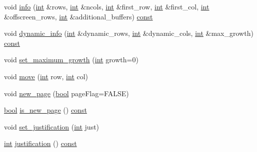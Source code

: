 \begin{DoxyCompactItemize}
\item 
void \hyperlink{class_n_curses_form_field_a7f7ee023466c743f620fc8812166243a}{info} (\hyperlink{term__entry_8h_ad65b480f8c8270356b45a9890f6499ae}{int} \&rows, \hyperlink{term__entry_8h_ad65b480f8c8270356b45a9890f6499ae}{int} \&ncols, \hyperlink{term__entry_8h_ad65b480f8c8270356b45a9890f6499ae}{int} \&first\-\_\-row, \hyperlink{term__entry_8h_ad65b480f8c8270356b45a9890f6499ae}{int} \&first\-\_\-col, \hyperlink{term__entry_8h_ad65b480f8c8270356b45a9890f6499ae}{int} \&offscreen\-\_\-rows, \hyperlink{term__entry_8h_ad65b480f8c8270356b45a9890f6499ae}{int} \&additional\-\_\-buffers) \hyperlink{term__entry_8h_a57bd63ce7f9a353488880e3de6692d5a}{const} 
\item 
void \hyperlink{class_n_curses_form_field_a2baaaaa202b7930dc3abedc8f287cee0}{dynamic\-\_\-info} (\hyperlink{term__entry_8h_ad65b480f8c8270356b45a9890f6499ae}{int} \&dynamic\-\_\-rows, \hyperlink{term__entry_8h_ad65b480f8c8270356b45a9890f6499ae}{int} \&dynamic\-\_\-cols, \hyperlink{term__entry_8h_ad65b480f8c8270356b45a9890f6499ae}{int} \&max\-\_\-growth) \hyperlink{term__entry_8h_a57bd63ce7f9a353488880e3de6692d5a}{const} 
\item 
void \hyperlink{class_n_curses_form_field_a2daff9cc66881dd8ce121a507fbcb986}{set\-\_\-maximum\-\_\-growth} (\hyperlink{term__entry_8h_ad65b480f8c8270356b45a9890f6499ae}{int} growth=0)
\item 
void \hyperlink{class_n_curses_form_field_acfc392ac4d948913c8ffcfea27a3dacb}{move} (\hyperlink{term__entry_8h_ad65b480f8c8270356b45a9890f6499ae}{int} row, \hyperlink{term__entry_8h_ad65b480f8c8270356b45a9890f6499ae}{int} col)
\item 
void \hyperlink{class_n_curses_form_field_adabefe351d19e74ea9a71b5e68033fb8}{new\-\_\-page} (\hyperlink{term__entry_8h_a002004ba5d663f149f6c38064926abac}{bool} page\-Flag=F\-A\-L\-S\-E)
\item 
\hyperlink{term__entry_8h_a002004ba5d663f149f6c38064926abac}{bool} \hyperlink{class_n_curses_form_field_a99afac5c3158dd9866ba4fe48a35782e}{is\-\_\-new\-\_\-page} () \hyperlink{term__entry_8h_a57bd63ce7f9a353488880e3de6692d5a}{const} 
\item 
void \hyperlink{class_n_curses_form_field_a63a141aa72721e4b20d8a83bb45f71e9}{set\-\_\-justification} (\hyperlink{term__entry_8h_ad65b480f8c8270356b45a9890f6499ae}{int} just)
\item 
\hyperlink{term__entry_8h_ad65b480f8c8270356b45a9890f6499ae}{int} \hyperlink{class_n_curses_form_field_afd1e8386bd4b1e022a9f401d431c5eda}{justification} () \hyperlink{term__entry_8h_a57bd63ce7f9a353488880e3de6692d5a}{const} 

\end{DoxyCompactItemize}
